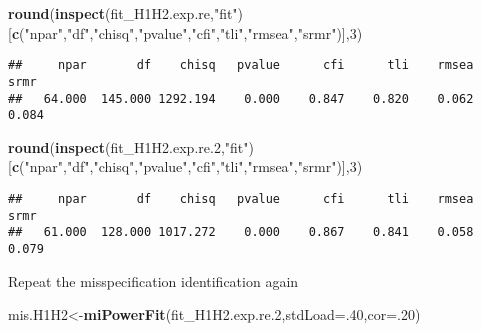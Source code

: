 \documentclass[
]{article}
\newenvironment{Shaded}{\begin{snugshade}}{\end{snugshade}}
\newcommand{\DataTypeTok}[1]{\textcolor[rgb]{0.13,0.29,0.53}{#1}}
\newcommand{\DecValTok}[1]{\textcolor[rgb]{0.00,0.00,0.81}{#1}}
\newcommand{\FloatTok}[1]{\textcolor[rgb]{0.00,0.00,0.81}{#1}}
\newcommand{\KeywordTok}[1]{\textcolor[rgb]{0.13,0.29,0.53}{\textbf{#1}}}
\newcommand{\NormalTok}[1]{#1}
\newcommand{\StringTok}[1]{\textcolor[rgb]{0.31,0.60,0.02}{#1}}
\begin{document}
\begin{Shaded}
\begin{Highlighting}[]
\KeywordTok{round}\NormalTok{(}\KeywordTok{inspect}\NormalTok{(fit_H1H2.exp.re,}\StringTok{"fit"}\NormalTok{)}
\NormalTok{      [}\KeywordTok{c}\NormalTok{(}\StringTok{"npar"}\NormalTok{,}\StringTok{"df"}\NormalTok{,}\StringTok{"chisq"}\NormalTok{,}\StringTok{"pvalue"}\NormalTok{,}\StringTok{"cfi"}\NormalTok{,}\StringTok{"tli"}\NormalTok{,}\StringTok{"rmsea"}\NormalTok{,}\StringTok{"srmr"}\NormalTok{)],}\DecValTok{3}\NormalTok{)}
\end{Highlighting}
\end{Shaded}

\begin{verbatim}
##     npar       df    chisq   pvalue      cfi      tli    rmsea     srmr 
##   64.000  145.000 1292.194    0.000    0.847    0.820    0.062    0.084
\end{verbatim}

\begin{Shaded}
\begin{Highlighting}[]
\KeywordTok{round}\NormalTok{(}\KeywordTok{inspect}\NormalTok{(fit_H1H2.exp.re}\FloatTok{.2}\NormalTok{,}\StringTok{"fit"}\NormalTok{)}
\NormalTok{      [}\KeywordTok{c}\NormalTok{(}\StringTok{"npar"}\NormalTok{,}\StringTok{"df"}\NormalTok{,}\StringTok{"chisq"}\NormalTok{,}\StringTok{"pvalue"}\NormalTok{,}\StringTok{"cfi"}\NormalTok{,}\StringTok{"tli"}\NormalTok{,}\StringTok{"rmsea"}\NormalTok{,}\StringTok{"srmr"}\NormalTok{)],}\DecValTok{3}\NormalTok{)}
\end{Highlighting}
\end{Shaded}

\begin{verbatim}
##     npar       df    chisq   pvalue      cfi      tli    rmsea     srmr 
##   61.000  128.000 1017.272    0.000    0.867    0.841    0.058    0.079
\end{verbatim}

Repeat the misspecification identification again

\begin{Shaded}
\begin{Highlighting}[]
\NormalTok{mis.H1H2<-}\KeywordTok{miPowerFit}\NormalTok{(fit_H1H2.exp.re}\FloatTok{.2}\NormalTok{,}\DataTypeTok{stdLoad=}\NormalTok{.}\DecValTok{40}\NormalTok{,}\DataTypeTok{cor=}\NormalTok{.}\DecValTok{20}\NormalTok{)}
\end{Highlighting}
\end{Shaded}
\end{document}
